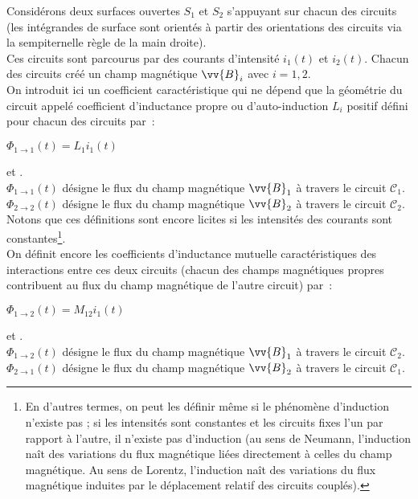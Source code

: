 \documentclass{article}
\newcommand{\mathcolorbox}[2]{\colorbox{#1}{$#2$}}
\renewcommand\overrightarrow{\vv}
\begin{document}
Considérons deux surfaces ouvertes $S_{1}$ et $S_{2}$ s'appuyant sur
chacun des circuits (les intégrandes de surface sont orientés à
partir des orientations des
circuits via la sempiternelle règle de la main droite). \\
Ces circuits sont parcourus par des courants d'intensité $i_{1}(t)$
et $i_{2}(t)$.
Chacun des circuits créé un champ magnétique $\overrightarrow{B}_{i}$ avec $i=1,2$. \\
On introduit ici un coefficient caractéristique qui ne dépend que la
géométrie du circuit appelé coefficient d'inductance propre ou d'auto-induction $L_{i}$  positif défini pour chacun des circuits par : \\
\centerline{\mathcolorbox{gray!20}{\Phi_{1\rightarrow 1}(t) = L_{1}i_{1}(t)}} et
. \\
$\Phi_{1\rightarrow 1}(t)$ désigne le flux du champ magnétique
$\overrightarrow{B}_{1}$ à travers le circuit $\mathcal{C}_{1}$. \\
$\Phi_{2\rightarrow 2}(t)$ désigne le flux du champ magnétique
$\overrightarrow{B}_{2}$ à travers le circuit $\mathcal{C}_{2}$. \\
Notons que ces définitions sont encore licites si les intensités des
courants sont constantes\footnote{En d'autres termes, on peut les
définir même si le phénomène d'induction n'existe pas ; si les
intensités sont constantes et les circuits fixes l'un par rapport à
l'autre, il n'existe pas d'induction (au sens de Neumann,
l'induction naît des variations du flux magnétique liées directement
à celles du champ magnétique. Au sens de Lorentz, l'induction naît
des variations du flux magnétique induites par le déplacement
relatif des circuits couplés).}. \\
On définit encore les coefficients d'inductance mutuelle
caractéristiques des interactions entre ces deux circuits (chacun
des champs magnétiques propres contribuent au flux du champ
magnétique de l'autre circuit) par : \\
\centerline{\mathcolorbox{gray!20}{\Phi_{1\rightarrow 2}(t) = M_{12}i_{1}(t)}} et
. \\
$\Phi_{1\rightarrow 2}(t)$ désigne le flux du champ magnétique
$\overrightarrow{B}_{1}$ à travers le circuit $\mathcal{C}_{2}$. \\
$\Phi_{2\rightarrow 1}(t)$ désigne le flux du champ magnétique
$\overrightarrow{B}_{2}$ à travers le circuit $\mathcal{C}_{1}$. \\
\end{document}

